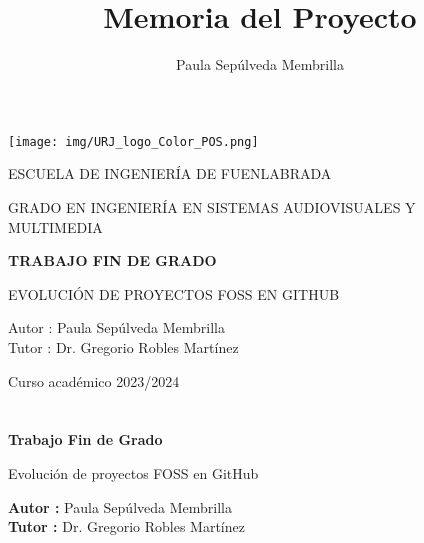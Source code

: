 \documentclass[a4paper, 12pt]{book}
\title{Memoria del Proyecto}
\author{Paula Sepúlveda Membrilla}
\begin{document}
\renewcommand{\refname}{Bibliografía}  %
\renewcommand{\appendixname}{Apéndice}



\begin{titlepage}
\begin{center}
\texttt{[image: img/URJ\_logo\_Color\_POS.png]}

\vspace{1.75cm}

\LARGE
ESCUELA DE INGENIERÍA DE FUENLABRADA
\vspace{1cm}

\LARGE
GRADO EN INGENIERÍA EN SISTEMAS AUDIOVISUALES Y MULTIMEDIA

\vspace{1cm}
\LARGE
\textbf{TRABAJO FIN DE GRADO}

\vspace{2cm}

\Large
EVOLUCIÓN DE PROYECTOS FOSS EN GITHUB

\vspace{2cm}

\large
Autor : Paula Sepúlveda Membrilla \\
Tutor : Dr. Gregorio Robles Martínez\\
\vspace{1cm}

\large
Curso académico 2023/2024

\end{center}
\end{titlepage}

\newpage
\mbox{}
\thispagestyle{empty} %



\clearpage
{}
\chapter*{}

\vspace{-4cm}
\begin{center}
\LARGE
\textbf{Trabajo Fin de Grado}

\vspace{1cm}
\large
Evolución de proyectos FOSS en GitHub

\vspace{1cm}
\large
\textbf{Autor :} Paula Sepúlveda Membrilla \\
\textbf{Tutor :} Dr. Gregorio Robles Martínez
\end{center}
\end{document}
